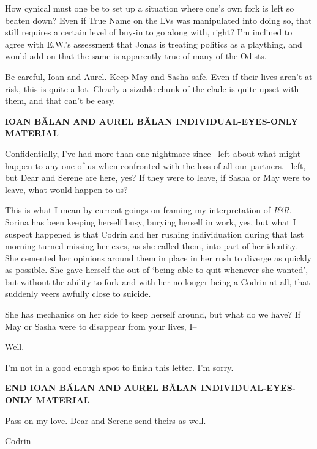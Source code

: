 How cynical must one be to set up a situation where one's own fork is left so beaten down? Even if True Name on the LVs was manipulated into doing so, that still requires a certain level of buy-in to go along with, right? I'm inclined to agree with E.W.'s assessment that Jonas is treating politics as a plaything, and would add on that the same is apparently true of many of the Odists.

Be careful, Ioan and Aurel. Keep May and Sasha safe. Even if their lives aren't at risk, this is quite a lot. Clearly a sizable chunk of the clade is quite upset with them, and that can't be easy.

\begin{center}
\textbf{IOAN BĂLAN AND AUREL BĂLAN INDIVIDUAL-EYES-ONLY MATERIAL}
\end{center}

Confidentially, I've had more than one nightmare since \Partner\ left about what might happen to any one of us when confronted with the loss of all our partners. \Partner\ left, but Dear and Serene are here, yes? If they were to leave, if Sasha or May were to leave, what would happen to us?

This is what I mean by current goings on framing my interpretation of \emph{I\&R}. Sorina has been keeping herself busy, burying herself in work, yes, but what I suspect happened is that Codrin and her rushing individuation during that last morning turned missing her exes, as she called them, into part of her identity. She cemented her opinions around them in place in her rush to diverge as quickly as possible. She gave herself the out of `being able to quit whenever she wanted', but without the ability to fork and with her no longer being a Codrin at all, that suddenly veers awfully close to suicide.

She has mechanics on her side to keep herself around, but what do we have? If May or Sasha were to disappear from your lives, I--

Well.

I'm not in a good enough spot to finish this letter. I'm sorry.

\begin{center}
\textbf{END IOAN BĂLAN AND AUREL BĂLAN INDIVIDUAL-EYES-ONLY MATERIAL}
\end{center}

Pass on my love. Dear and Serene send theirs as well.

Codrin
